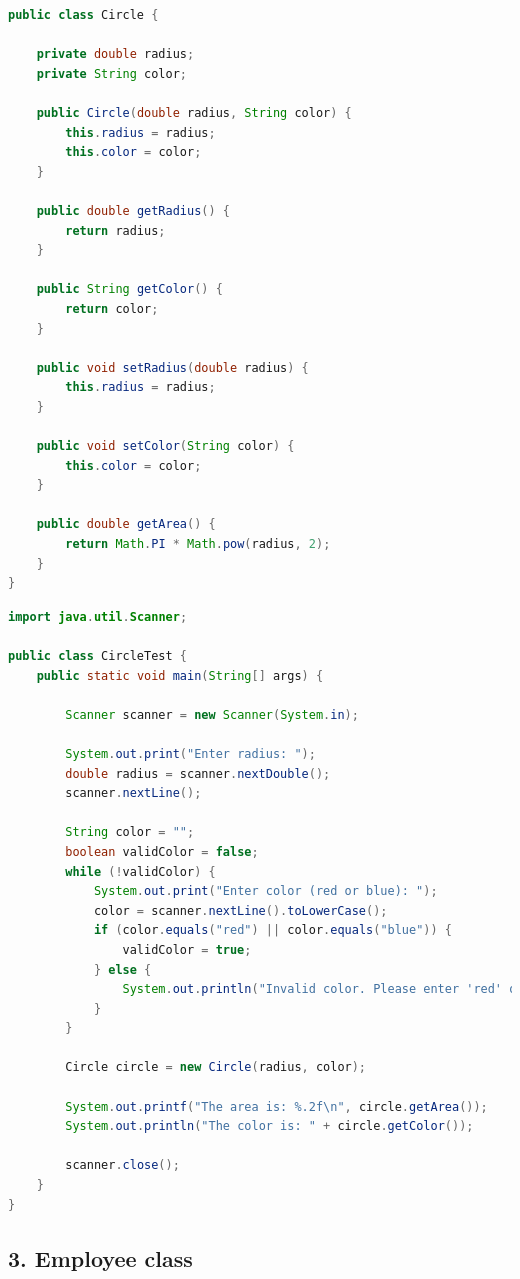 \documentclass{article}
\begin{document}
\begin{lstlisting}[language=Java, caption=Circle.java]
public class Circle {

    private double radius;
    private String color;

    public Circle(double radius, String color) {
        this.radius = radius;
        this.color = color;
    }

    public double getRadius() {
        return radius;
    }

    public String getColor() {
        return color;
    }

    public void setRadius(double radius) {
        this.radius = radius;
    }

    public void setColor(String color) {
        this.color = color;
    }

    public double getArea() {
        return Math.PI * Math.pow(radius, 2);
    }
}
\end{lstlisting}

\begin{lstlisting}[language=Java, caption=CircleTest.java]
import java.util.Scanner;

public class CircleTest {
    public static void main(String[] args) {

        Scanner scanner = new Scanner(System.in);

        System.out.print("Enter radius: ");
        double radius = scanner.nextDouble();
        scanner.nextLine();

        String color = "";
        boolean validColor = false;
        while (!validColor) {
            System.out.print("Enter color (red or blue): ");
            color = scanner.nextLine().toLowerCase();
            if (color.equals("red") || color.equals("blue")) {
                validColor = true;
            } else {
                System.out.println("Invalid color. Please enter 'red' or 'blue'.");
            }
        }

        Circle circle = new Circle(radius, color);

        System.out.printf("The area is: %.2f\n", circle.getArea());
        System.out.println("The color is: " + circle.getColor());

        scanner.close();
    }
}
\end{lstlisting}

\subsection*{3. Employee class}
\end{document}
